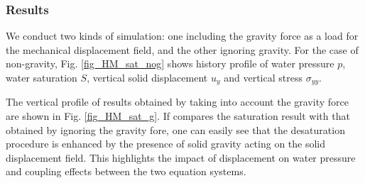 \subsubsection*{Results}
We conduct two kinds of simulation: one including the gravity force as a load for the mechanical displacement field, and the other ignoring gravity. For the case of non-gravity, Fig. \ref{fig_HM_sat_nog} shows history profile of water pressure $p$, water saturation $S$, vertical solid displacement $u_y$ and vertical stress $\sigma _{yy}$.

The vertical profile of results obtained by taking into account the gravity force are shown in Fig. \ref{fig_HM_sat_g}. If compares the saturation result with that obtained by ignoring the gravity fore, one can easily see that the desaturation procedure is enhanced by the presence of solid gravity acting on the solid displacement field. This highlights the impact of displacement on water pressure and coupling effects between the two equation systems.
